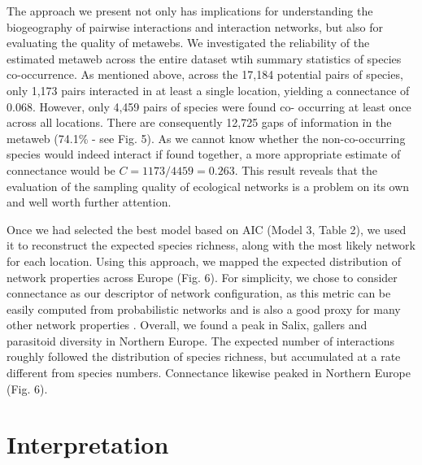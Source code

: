 \documentclass[12pt]{article}
\begin{document}
The approach we present not only has implications for understanding the
biogeography of pairwise interactions and interaction networks, but also for
evaluating the quality of metawebs. We investigated the reliability of the
estimated metaweb across the entire dataset wtih summary statistics of species
co-occurrence. As mentioned above, across the 17,184 potential pairs of
species, only 1,173 pairs interacted in at least a single location, yielding a
connectance of 0.068. However, only 4,459 pairs of species were found co-
occurring at least once across all locations. There are consequently 12,725
gaps of information in the metaweb (74.1\% - see Fig. 5). As we cannot know
whether the non-co-occurring species would indeed interact if found
together, a more appropriate estimate of connectance would be
$C=1173/4459=0.263$. This result reveals that the evaluation of the sampling
quality of ecological networks is a problem on its own and well worth further
attention.

Once we had selected the best model based on AIC (Model 3, Table 2), we used it to
reconstruct the expected species richness, along with the most likely network
for each location. Using this approach, we mapped the expected distribution of
network properties across Europe (Fig. 6). For simplicity, we chose to
consider connectance as our descriptor of network configuration, as this
metric can be easily computed from probabilistic networks \citep{Poisot2015c}
and is also a good proxy for many other network properties \citep{Poisot2014}.
Overall, we found a peak in Salix, gallers and parasitoid diversity in Northern
Europe. The expected number of interactions roughly followed the distribution
of species richness, but accumulated at a rate different from species numbers.
Connectance likewise peaked in Northern Europe (Fig. 6).

\section*{Interpretation}
\end{document}
